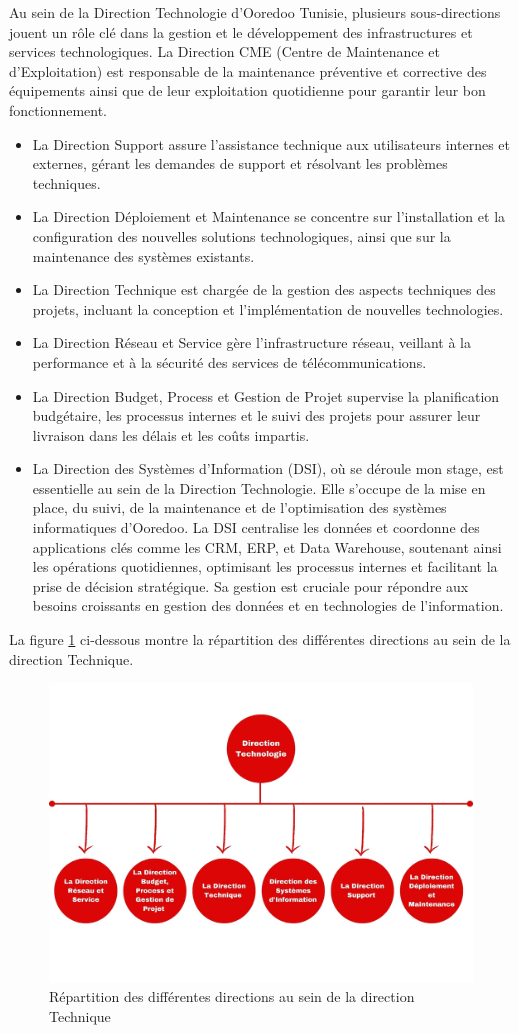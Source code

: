 Au sein de la Direction Technologie d'Ooredoo Tunisie, plusieurs sous-directions jouent un rôle clé dans la gestion et le développement des infrastructures et services technologiques.
La Direction CME (Centre de Maintenance et d'Exploitation) est responsable de la maintenance préventive et corrective des équipements ainsi que de leur exploitation quotidienne pour garantir leur bon fonctionnement. 
\begin{itemize}
    

\item La Direction Support assure l'assistance technique aux utilisateurs internes et externes, gérant les demandes de support et résolvant les problèmes techniques. 
\item La Direction Déploiement et Maintenance se concentre sur l'installation et la configuration des nouvelles solutions technologiques, ainsi que sur la maintenance des systèmes existants. 
\item La Direction Technique est chargée de la gestion des aspects techniques des projets, incluant la conception et l'implémentation de nouvelles technologies. 
\item La Direction Réseau et Service gère l'infrastructure réseau, veillant à la performance et à la sécurité des services de télécommunications. 
\item La Direction Budget, Process et Gestion de Projet supervise la planification budgétaire, les processus internes et le suivi des projets pour assurer leur livraison dans les délais et les coûts impartis.
\item La Direction des Systèmes d'Information (DSI), où se déroule mon stage, est essentielle au sein de la Direction Technologie. Elle s'occupe de la mise en place, du suivi, de la maintenance et de l'optimisation des systèmes informatiques d'Ooredoo. La DSI centralise les données et coordonne des applications clés comme les CRM, ERP, et Data Warehouse, soutenant ainsi les opérations quotidiennes, optimisant les processus internes et facilitant la prise de décision stratégique. Sa gestion est cruciale pour répondre aux besoins croissants en gestion des données et en technologies de l'information.
\end{itemize}

La figure \ref{it} ci-dessous montre la répartition des différentes directions au sein de la direction Technique.
\begin{figure}[H]
    \centering
    \includegraphics[width=0.5\linewidth]{DepIT_Ooredoo.jpg}
    \caption{Répartition des différentes directions au sein de la direction Technique}
    \label{it}
\end{figure}

